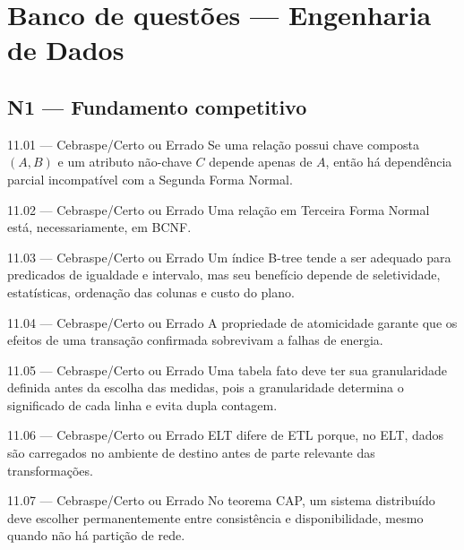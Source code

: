 \section{Banco de questões — Engenharia de Dados}

\subsection*{N1 — Fundamento competitivo}

\begin{questao}{ 11.01 — Cebraspe/Certo ou Errado}
Se uma relação possui chave composta $(A,B)$ e um atributo não-chave $C$ depende apenas de $A$, então há dependência parcial incompatível com a Segunda Forma Normal.
\end{questao}

\begin{questao}{ 11.02 — Cebraspe/Certo ou Errado}
Uma relação em Terceira Forma Normal está, necessariamente, em BCNF.
\end{questao}

\begin{questao}{ 11.03 — Cebraspe/Certo ou Errado}
Um índice B-tree tende a ser adequado para predicados de igualdade e intervalo, mas seu benefício depende de seletividade, estatísticas, ordenação das colunas e custo do plano.
\end{questao}

\begin{questao}{ 11.04 — Cebraspe/Certo ou Errado}
A propriedade de atomicidade garante que os efeitos de uma transação confirmada sobrevivam a falhas de energia.
\end{questao}

\begin{questao}{ 11.05 — Cebraspe/Certo ou Errado}
Uma tabela fato deve ter sua granularidade definida antes da escolha das medidas, pois a granularidade determina o significado de cada linha e evita dupla contagem.
\end{questao}

\begin{questao}{ 11.06 — Cebraspe/Certo ou Errado}
ELT difere de ETL porque, no ELT, dados são carregados no ambiente de destino antes de parte relevante das transformações.
\end{questao}

\begin{questao}{ 11.07 — Cebraspe/Certo ou Errado}
No teorema CAP, um sistema distribuído deve escolher permanentemente entre consistência e disponibilidade, mesmo quando não há partição de rede.
\end{questao}

